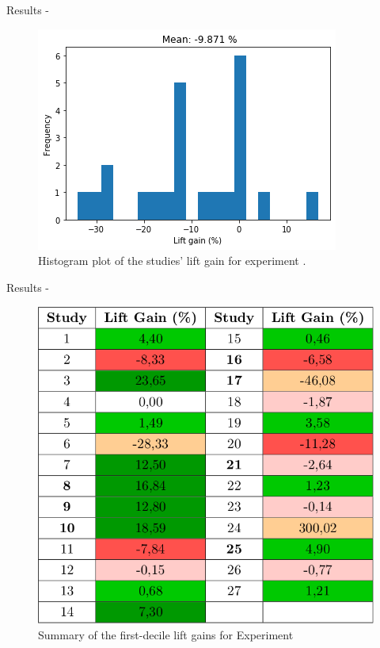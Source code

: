 \begin{frame}{Results - \fullNameExperimentI{}}
    \begin{figure}
       \centering
       \includegraphics[width=.8\linewidth]{fig/ch4-lift-hist-plot-exp-i.png}
       \caption{Histogram plot of the studies' lift gain for experiment \nameExperimentI{}.}
       \label{fig:lift-hist-plot-exp-i}
    \end{figure}
\end{frame}


\begin{frame}{Results - \fullNameExperimentII{}} \pause
    \begin{figure}
        \centering
        \includegraphics[width=.6\linewidth]{fig/ch4-table-exp-ii.png}
        \caption{Summary of the first-decile lift gains for Experiment \nameExperimentII}
    \end{figure}
\end{frame}


